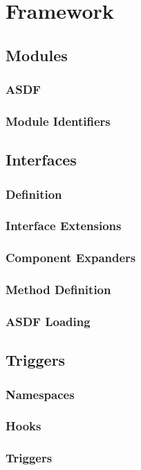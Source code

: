 \section{Framework}

\subsection{Modules}
\subsubsection{ASDF}
\subsubsection{Module Identifiers}

\subsection{Interfaces}
\subsubsection{Definition}
\subsubsection{Interface Extensions}
\subsubsection{Component Expanders}
\subsubsection{Method Definition}
\subsubsection{ASDF Loading}

\subsection{Triggers}
\subsubsection{Namespaces}
\subsubsection{Hooks}
\subsubsection{Triggers}

